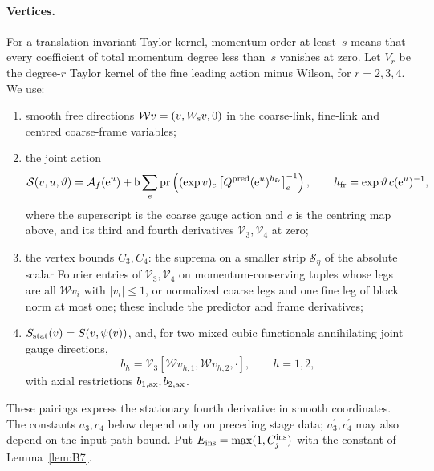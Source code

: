 \paragraph{Vertices.} For a translation-invariant Taylor kernel, momentum order at least~$s$ means that every coefficient of total momentum degree less than~$s$ vanishes at zero. Let $V_r$ be the degree-$r$ Taylor kernel of the fine leading action minus Wilson, for $r=2,3,4$. We use:
\begin{enumerate}[label=(\alph*)]
\item smooth free directions $\mathcal Wv=(v,W_{\rm s}v,0)$ in the coarse-link, fine-link and centred coarse-frame variables;
\item the joint action
\begin{equation*}
\mathcal S(v,u,\vartheta)=\mathcal A_f(\mathrm e^u)+\mathsf{b}\sum_e\operatorname{pr}\left((\exp v)_e\left[Q^{\rm pred}(\mathrm e^u)^{h_{\rm fr}}\right]_e^{-1}\right),\qquad
h_{\rm fr}=\exp\vartheta\,c(\mathrm e^u)^{-1},
\end{equation*}
where the superscript is the coarse gauge action and $c$ is the centring map above, and its third and fourth derivatives $\mathcal V_3,\mathcal V_4$ at zero;
\item the vertex bounds $C_3,C_4$: the suprema on a smaller strip $\mathcal S_\eta$ of the absolute scalar Fourier entries of $\mathcal V_3,\mathcal V_4$ on momentum-conserving tuples whose legs are all $\mathcal Wv_i$ with $|v_i|\le1$, or normalized coarse legs and one fine leg of block norm at most one; these include the predictor and frame derivatives;
\item $S_{\rm stat}(v)=S(v,\psi(v))$, and, for two mixed cubic functionals annihilating joint gauge directions,
\begin{equation*}
b_h=\mathcal V_3[\mathcal Wv_{h,1},\mathcal Wv_{h,2},\cdot],\qquad h=1,2,
\end{equation*}
with axial restrictions $b_{1,\rm ax},b_{2,\rm ax}$.
\end{enumerate}
These pairings express the stationary fourth derivative in smooth coordinates. The constants $a_3,c_4$ below depend only on preceding stage data; $a_3^\prime,c_4^\prime$ may also depend on the input path bound. Put $E_{\rm ins}=\max(1,C_j^{\rm ins})$ with the constant of Lemma~\ref{lem:B7}.

